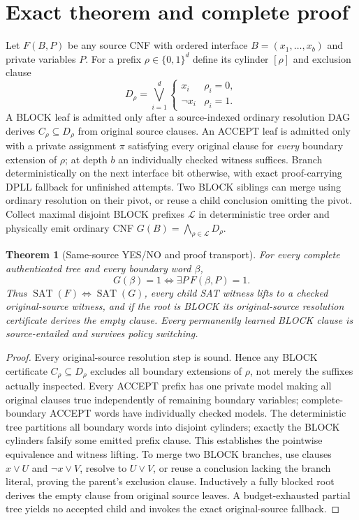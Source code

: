 \documentclass[11pt]{article}
\newtheorem{theorem}{Theorem}
\begin{document}
\section{Exact theorem and complete proof}
Let $F(B,P)$ be any source CNF with ordered interface $B=(x_1,\ldots,x_b)$ and private variables $P$. For a prefix $\rho\in\{0,1\}^d$ define its cylinder $[\rho]$ and exclusion clause
\[
D_\rho=\bigvee_{i=1}^{d} \begin{cases}x_i&\rho_i=0,\\ \neg x_i&\rho_i=1.\end{cases}
\]
A BLOCK leaf is admitted only after a source-indexed ordinary resolution DAG derives $C_\rho\subseteq D_\rho$ from original source clauses. An ACCEPT leaf is admitted only with a private assignment $\pi$ satisfying every original clause for \emph{every} boundary extension of $\rho$; at depth $b$ an individually checked witness suffices. Branch deterministically on the next interface bit otherwise, with exact proof-carrying DPLL fallback for unfinished attempts. Two BLOCK siblings can merge using ordinary resolution on their pivot, or reuse a child conclusion omitting the pivot. Collect maximal disjoint BLOCK prefixes $\mathcal L$ in deterministic tree order and physically emit ordinary CNF $G(B)=\bigwedge_{\rho\in\mathcal L}D_\rho$.

\begin{theorem}[Same-source YES/NO and proof transport]
For every complete authenticated tree and every boundary word $\beta$,
\[
G(\beta)=1\iff \exists P\,F(\beta,P)=1.
\]
Thus $\operatorname{SAT}(F)\iff\operatorname{SAT}(G)$, every child SAT witness lifts to a checked original-source witness, and if the root is BLOCK its original-source resolution certificate derives the empty clause. Every permanently learned BLOCK clause is source-entailed and survives policy switching.
\end{theorem}
\begin{proof}
Every original-source resolution step is sound. Hence any BLOCK certificate $C_\rho\subseteq D_\rho$ excludes all boundary extensions of $\rho$, not merely the suffixes actually inspected. Every ACCEPT prefix has one private model making all original clauses true independently of remaining boundary variables; complete-boundary ACCEPT words have individually checked models. The deterministic tree partitions all boundary words into disjoint cylinders; exactly the BLOCK cylinders falsify some emitted prefix clause. This establishes the pointwise equivalence and witness lifting. To merge two BLOCK branches, use clauses $x\lor U$ and $\neg x\lor V$, resolve to $U\lor V$, or reuse a conclusion lacking the branch literal, proving the parent's exclusion clause. Inductively a fully blocked root derives the empty clause from original source leaves. A budget-exhausted partial tree yields no accepted child and invokes the exact original-source fallback. \qedhere
\end{proof}
\end{document}
